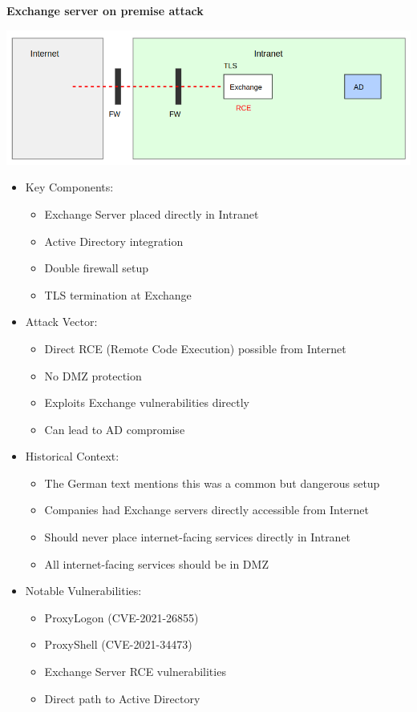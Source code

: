 \textbf{Exchange server on premise attack}
\begin{center}
   \includegraphics[scale=0.5]{resources/02-exchange-server-on-prem-attack.png}
\end{center}
\begin{itemize}
	\item Key Components:
    \begin{itemize}
        \tightlist
		\item Exchange Server placed directly in Intranet
		\item Active Directory integration
		\item Double firewall setup
		\item TLS termination at Exchange
    \end{itemize}

	\item Attack Vector:
    \begin{itemize}
        \tightlist
		\item Direct RCE (Remote Code Execution) possible from Internet
		\item No DMZ protection
		\item Exploits Exchange vulnerabilities directly
		\item Can lead to AD compromise
    \end{itemize}

	\item Historical Context:
    \begin{itemize}
        \tightlist
		\item The German text mentions this was a common but dangerous setup
		\item Companies had Exchange servers directly accessible from Internet
		\item Should never place internet-facing services directly in Intranet
		\item All internet-facing services should be in DMZ
    \end{itemize}

	\item Notable Vulnerabilities:
    \begin{itemize}
        \tightlist
		\item ProxyLogon (CVE-2021-26855)
		\item ProxyShell (CVE-2021-34473)
		\item Exchange Server RCE vulnerabilities
		\item Direct path to Active Directory
    \end{itemize}
\end{itemize}

